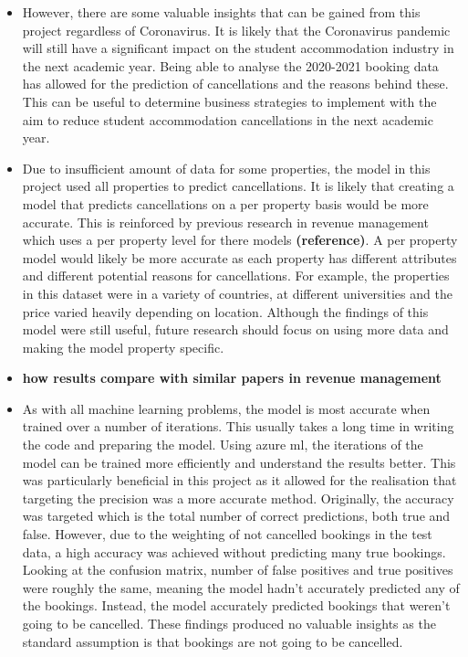\begin{itemize}
\item However, there are some valuable insights that can be gained from this project regardless of Coronavirus. It is likely that the Coronavirus pandemic will still have a significant impact on the student accommodation industry in the next academic year. Being able to analyse the 2020-2021 booking data has allowed for the prediction of cancellations and the reasons behind these. This can be useful to determine business strategies to implement with the aim to reduce student accommodation cancellations in the next academic year. 
\item Due to insufficient amount of data for some properties, the model in this project used all properties to predict cancellations. It is likely that creating a model that predicts cancellations on a per property basis would be more accurate. This is reinforced by previous research in revenue management which uses a per property level for there models \textbf{(reference)}. A per property model would likely be more accurate as each property has different attributes and different potential reasons for cancellations. For example, the properties in this dataset were in a variety of countries, at different universities and the price varied heavily depending on location. Although the findings of this model were still useful, future research should focus on using more data and making the model property specific. 
\item \textbf{how results compare with similar papers in revenue management }
\item As with all machine learning problems, the model is most accurate when trained over a number of iterations. This usually takes a long time in writing the code and preparing the model. Using azure ml, the iterations of the model can be trained more efficiently and understand the results better. This was particularly beneficial in this project as it allowed for the realisation that targeting the precision was a more accurate method. Originally, the accuracy was targeted which is the total number of correct predictions, both true and false. However, due to the weighting of not cancelled bookings in the test data, a high accuracy was achieved without predicting many true bookings. Looking at the confusion matrix, number of false positives and true positives were roughly the same, meaning the model hadn't accurately predicted any of the bookings. Instead, the model accurately predicted bookings that weren't going to be cancelled. These findings produced no valuable insights as the standard assumption is that bookings are not going to be cancelled. 

\end{itemize}
